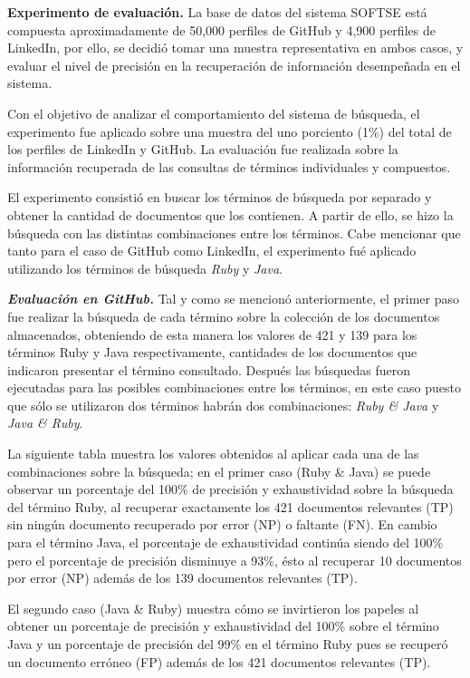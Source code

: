 \textbf{Experimento de evaluación.} La base de datos del sistema SOFTSE está compuesta aproximadamente de 50,000 perfiles de GitHub y 4,900 perfiles de LinkedIn, por ello, se decidió tomar una muestra representativa en ambos casos, y evaluar el nivel de precisión en la recuperación de información desempeñada en el sistema.

Con el objetivo de analizar el comportamiento del sistema de búsqueda, el experimento fue aplicado sobre una muestra del uno porciento (1\%) del total de los perfiles de LinkedIn y GitHub. La evaluación fue realizada sobre la información recuperada de las consultas de términos individuales y compuestos.

El experimento consistió en buscar los términos de búsqueda por separado y obtener la cantidad de documentos que los contienen. A partir de ello, se hizo la búsqueda con las distintas combinaciones entre los términos. Cabe mencionar que tanto para el caso de GitHub como LinkedIn, el experimento fué aplicado utilizando los términos de búsqueda \textit{Ruby} y \textit{Java}.

\textit{\textbf{Evaluación en GitHub.}} Tal y como se mencionó anteriormente, el primer paso fue realizar la búsqueda de cada término sobre la colección de los documentos almacenados, obteniendo de esta manera los valores de 421 y 139 para los términos Ruby y Java respectivamente, cantidades de los documentos que indicaron presentar el término consultado. Después las búsquedas fueron ejecutadas para las posibles combinaciones entre los términos, en este caso puesto que sólo se utilizaron dos términos habrán dos combinaciones: \textit{Ruby \& Java} y \textit{Java \& Ruby}. 

La siguiente tabla muestra los valores obtenidos al aplicar cada una de las combinaciones sobre la búsqueda; en el primer caso (Ruby \& Java) se puede observar un porcentaje del 100\% de precisión y exhaustividad sobre la búsqueda del término Ruby, al recuperar exactamente los 421 documentos relevantes (TP) sin ningún documento recuperado por error (NP) o faltante (FN). En cambio para el término Java, el porcentaje de exhaustividad continúa siendo del 100\% pero el porcentaje de precisión disminuye a 93\%, ésto al recuperar 10 documentos por error (NP) además de los 139 documentos relevantes (TP). 

El segundo caso (Java \& Ruby) muestra cómo se invirtieron los papeles al obtener un porcentaje de precisión y exhaustividad del 100\% sobre el término Java y un porcentaje de precisión del 99\% en el término Ruby pues se recuperó un documento erróneo (FP) además de los 421 documentos relevantes (TP).  \\

